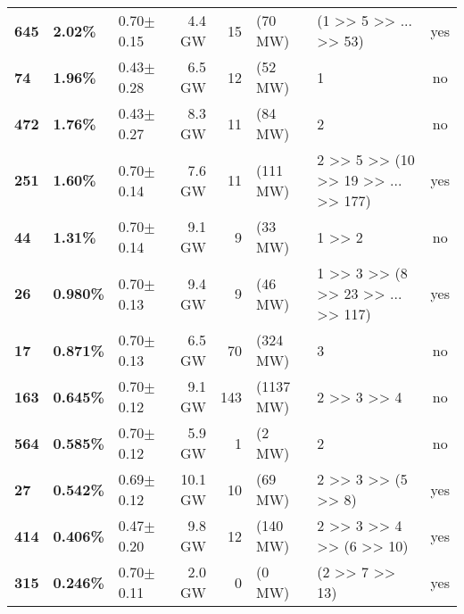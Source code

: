\begin{tabular}{lll|rrl|lc}
\textbf{645} & \textbf{ 2.02\hphantom{0}\%} &  0.70$\pm$0.15 &       4.4 GW &      15 & (70 MW) & \multicolumn{1}{p{12em}}{                          (1 >> 5 >> ... >> 53) } &                yes \\
\textbf{74 } & \textbf{ 1.96\hphantom{0}\%} &  0.43$\pm$0.28 &       6.5 GW &      12 & (52 MW) & \multicolumn{1}{p{12em}}{                                              1 } &                 no \\
\textbf{472} & \textbf{ 1.76\hphantom{0}\%} &  0.43$\pm$0.27 &       8.3 GW &      11 & (84 MW) & \multicolumn{1}{p{12em}}{                                              2 } &                 no \\
\textbf{251} & \textbf{ 1.60\hphantom{0}\%} &  0.70$\pm$0.14 &       7.6 GW &     11 & (111 MW) & \multicolumn{1}{p{12em}}{             2 >> 5 >> (10 >> 19 >> ... >> 177) } &                yes \\
\textbf{44 } & \textbf{ 1.31\hphantom{0}\%} &  0.70$\pm$0.14 &       9.1 GW &       9 & (33 MW) & \multicolumn{1}{p{12em}}{                                         1 >> 2 } &                 no \\
\textbf{26 } & \textbf{ 0.980\%} &  0.70$\pm$0.13 &       9.4 GW &       9 & (46 MW) & \multicolumn{1}{p{12em}}{              1 >> 3 >> (8 >> 23 >> ... >> 117) } &                yes \\
\textbf{17 } & \textbf{ 0.871\%} &  0.70$\pm$0.13 &       6.5 GW &     70 & (324 MW) & \multicolumn{1}{p{12em}}{                                              3 } &                 no \\
\textbf{163} & \textbf{ 0.645\%} &  0.70$\pm$0.12 &       9.1 GW &   143 & (1137 MW) & \multicolumn{1}{p{12em}}{                                    2 >> 3 >> 4 } &                 no \\
\textbf{564} & \textbf{ 0.585\%} &  0.70$\pm$0.12 &       5.9 GW &        1 & (2 MW) & \multicolumn{1}{p{12em}}{                                              2 } &                 no \\
\textbf{27 } & \textbf{ 0.542\%} &  0.69$\pm$0.12 &      10.1 GW &      10 & (69 MW) & \multicolumn{1}{p{12em}}{                             2 >> 3 >> (5 >> 8) } &                yes \\
\textbf{414} & \textbf{ 0.406\%} &  0.47$\pm$0.20 &       9.8 GW &     12 & (140 MW) & \multicolumn{1}{p{12em}}{                       2 >> 3 >> 4 >> (6 >> 10) } &                yes \\
\textbf{315} & \textbf{ 0.246\%} &  0.70$\pm$0.11 &       2.0 GW &        0 & (0 MW) & \multicolumn{1}{p{12em}}{                                 (2 >> 7 >> 13) } &                yes \\

\end{tabular}
